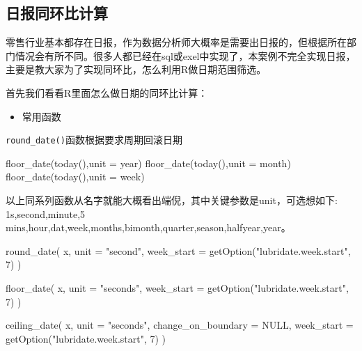 \documentclass[
]{book}
\newenvironment{Shaded}{\begin{snugshade}}{\end{snugshade}}
\newcommand{\AttributeTok}[1]{\textcolor[rgb]{0.77,0.63,0.00}{#1}}
\newcommand{\ConstantTok}[1]{\textcolor[rgb]{0.00,0.00,0.00}{#1}}
\newcommand{\DecValTok}[1]{\textcolor[rgb]{0.00,0.00,0.81}{#1}}
\newcommand{\FunctionTok}[1]{\textcolor[rgb]{0.00,0.00,0.00}{#1}}
\newcommand{\NormalTok}[1]{#1}
\newcommand{\StringTok}[1]{\textcolor[rgb]{0.31,0.60,0.02}{#1}}
\providecommand{\tightlist}{%
  \setlength{\itemsep}{0pt}\setlength{\parskip}{0pt}}
\begin{document}
\hypertarget{ux65e5ux62a5ux540cux73afux6bd4ux8ba1ux7b97}{%
\subsection{日报同环比计算}\label{ux65e5ux62a5ux540cux73afux6bd4ux8ba1ux7b97}}

零售行业基本都存在日报，作为数据分析师大概率是需要出日报的，但根据所在部门情况会有所不同。很多人都已经在sql或exel中实现了，本案例不完全实现日报，主要是教大家为了实现同环比，怎么利用R做日期范围筛选。

首先我们看看R里面怎么做日期的同环比计算：

\begin{itemize}
\tightlist
\item
  常用函数
\end{itemize}

\texttt{round\_date()}函数根据要求周期回滚日期

\begin{Shaded}
\begin{Highlighting}[]
\FunctionTok{floor\_date}\NormalTok{(}\FunctionTok{today}\NormalTok{(),}\AttributeTok{unit =} \StringTok{\textquotesingle{}year\textquotesingle{}}\NormalTok{)}
\FunctionTok{floor\_date}\NormalTok{(}\FunctionTok{today}\NormalTok{(),}\AttributeTok{unit =} \StringTok{\textquotesingle{}month\textquotesingle{}}\NormalTok{) }
\FunctionTok{floor\_date}\NormalTok{(}\FunctionTok{today}\NormalTok{(),}\AttributeTok{unit =} \StringTok{\textquotesingle{}week\textquotesingle{}}\NormalTok{)}
\end{Highlighting}
\end{Shaded}

以上同系列函数从名字就能大概看出端倪，其中关键参数是unit，可选想如下:
1s,second,minute,5 mins,hour,dat,week,months,bimonth,quarter,season,halfyear,year。

\begin{Shaded}
\begin{Highlighting}[]
\FunctionTok{round\_date}\NormalTok{(}
\NormalTok{  x,}
  \AttributeTok{unit =} \StringTok{"second"}\NormalTok{,}
  \AttributeTok{week\_start =} \FunctionTok{getOption}\NormalTok{(}\StringTok{"lubridate.week.start"}\NormalTok{, }\DecValTok{7}\NormalTok{)}
\NormalTok{)}

\FunctionTok{floor\_date}\NormalTok{(}
\NormalTok{  x,}
  \AttributeTok{unit =} \StringTok{"seconds"}\NormalTok{,}
  \AttributeTok{week\_start =} \FunctionTok{getOption}\NormalTok{(}\StringTok{"lubridate.week.start"}\NormalTok{, }\DecValTok{7}\NormalTok{)}
\NormalTok{)}

\FunctionTok{ceiling\_date}\NormalTok{(}
\NormalTok{  x,}
  \AttributeTok{unit =} \StringTok{"seconds"}\NormalTok{,}
  \AttributeTok{change\_on\_boundary =} \ConstantTok{NULL}\NormalTok{,}
  \AttributeTok{week\_start =} \FunctionTok{getOption}\NormalTok{(}\StringTok{"lubridate.week.start"}\NormalTok{, }\DecValTok{7}\NormalTok{)}
\NormalTok{)}
\end{Highlighting}
\end{Shaded}
\end{document}
